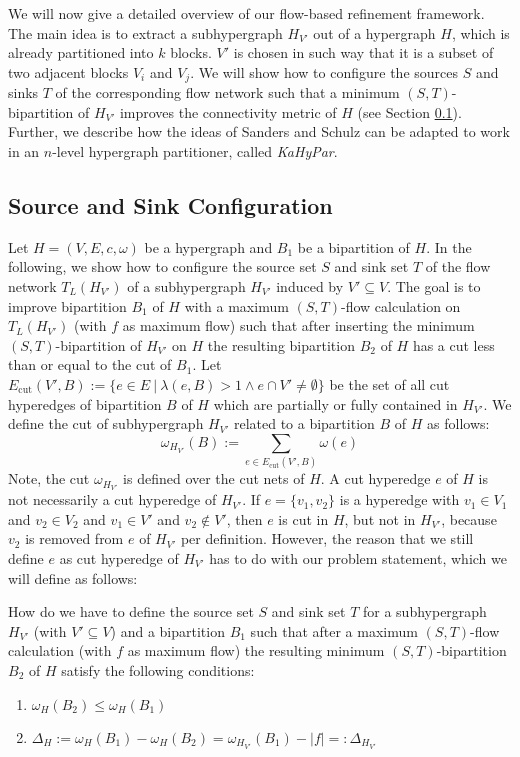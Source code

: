 We will now give a detailed overview of our flow-based refinement framework. The main
idea is to extract a subhypergraph $H_{V'}$ out of a hypergraph $H$, which is already
partitioned into $k$ blocks. $V'$ is chosen in such way that it is a subset of two
adjacent blocks $V_i$ and $V_j$. We will show how to configure
the sources $S$ and sinks $T$ of the corresponding flow network such that
a minimum $(S,T)$-bipartition of $H_{V'}$ improves the connectivity metric of $H$
(see Section \ref{sec:source_and_sink}). Further, we describe how the ideas of
Sanders and Schulz \cite{sanders2011engineering} 
can be adapted to work in an $n$-level hypergraph partitioner, called \emph{KaHyPar}. 

\subsection{Source and Sink Configuration}
\label{sec:source_and_sink}

Let $H = (V,E,c,\omega)$ be a hypergraph and $B_1$ be a bipartition of $H$.
In the following, we show how to configure the source set $S$ and sink set $T$ of the flow
network $T_L(H_{V'})$ of a subhypergraph $H_{V'}$ induced by $V' \subseteq V$. The goal is 
to improve bipartition $B_1$ of $H$ with a maximum $(S,T)$-flow calculation 
on $T_L(H_{V'})$ (with $f$ as maximum flow) such that after inserting the minimum 
$(S,T)$-bipartition of $H_{V'}$ on $H$ the resulting bipartition $B_2$ of $H$ has a 
cut less than or equal to the cut of $B_1$.
Let $E_{\text{cut}}(V',B) := \{ e \in E\ |\ \lambda(e,B) > 1 \land e \cap V' \neq \emptyset\}$ 
be the set of all cut hyperedges of bipartition $B$ of $H$ which are partially or fully contained in $H_{V'}$.
We define the cut of subhypergraph $H_{V'}$ related to a bipartition $B$ of $H$
as follows:
\[\omega_{H_{V'}}(B) := \sum_{e \in E_{\text{cut}}(V',B)} \omega(e) \]
Note, the cut $\omega_{H_{V'}}$ is defined over the
cut nets of $H$. A cut hyperedge $e$ of $H$ is not necessarily a cut hyperedge
of $H_{V'}$. If $e = \{v_1,v_2\}$ is a hyperedge with $v_1 \in V_1$ and $v_2 \in V_2$ and
$v_1 \in V'$ and $v_2 \notin V'$, then $e$ is cut in $H$, but not in $H_{V'}$, because
$v_2$ is removed from $e$ of $H_{V'}$ per definition. However, the reason that we still
define $e$ as cut hyperedge of $H_{V'}$ has to do with our problem statement, 
which we will define as follows:

\begin{problem}
\label{prob:ST}
How do we have to define the source set $S$ and sink set $T$ for a subhypergraph $H_{V'}$ 
(with $V' \subseteq V$) and a bipartition $B_1$ such that 
after a maximum $(S,T)$-flow calculation (with $f$ as maximum flow)
the resulting minimum $(S,T)$-bipartition $B_2$ of $H$ satisfy the following conditions:
\begin{enumerate}
\item $\omega_H(B_2) \le \omega_H(B_1)$
\item $\Delta_{H} := \omega_H(B_1) - \omega_H(B_2) = \omega_{H_{V'}}(B_1) - |f| =: \Delta_{H_{V'}}$
\end{enumerate}
\end{problem}

